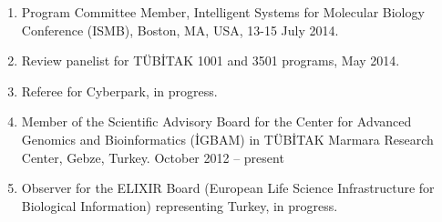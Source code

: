 \begin{enumerate}
\item
  Program Committee Member, Intelligent Systems for Molecular Biology Conference (ISMB), Boston, MA, USA, 13-15 July 2014.
\item Review panelist for  TÜBİTAK 1001 and 3501 programs, May 2014.
\item Referee for Cyberpark, in progress.
\item Member of the Scientific Advisory Board for the Center for Advanced Genomics and Bioinformatics (İGBAM) in TÜBİTAK Marmara Research Center, Gebze, Turkey. October 2012 – present
\item Observer for the ELIXIR Board (European Life Science Infrastructure for Biological Information)  representing Turkey, in progress.
\end{enumerate}
